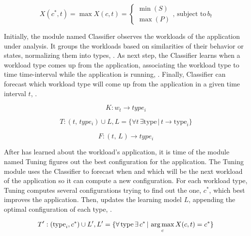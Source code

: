 \begin{equation}
  X(c^{*}, t) = \max{X(c, t)} =
  \begin{cases}
    \min(S) \\
    \max(P)
  \end{cases},\, \text{subject to}\, b_t
  \label{eq:optimization}
\end{equation}

Initially, the module named Classifier observes the workloads of the application under analysis. It groups the
workloads based on similarities of their behavior or states, normalizing them into types, . As next
step, the Classifier learns when a workload type comes up from the application, associating the workload type to time
time-interval while the application is running, . Finally, Classifier can forecast which workload type
will come up from the application in a given time interval $t$, .

\begin{equation}
  K: w_t \rightarrow type_i
  \label{eq:classify}
\end{equation}

\begin{equation}
  T: (t,\, type_i) \cup L, L = \{ \forall t\,\exists \text{type}\, |\, t \rightarrow \text{type}_i \}
  \label{eq:training}
\end{equation}

\begin{equation}
  F: (t, \, L) \rightarrow type_i
  \label{eq:forecast}
\end{equation}

After \name has learned about the workload's application, it is time of the module named Tuning figures out the best
configuration for the application. The Tuning module uses the Classifier to forecast when and which will be the next
workload of the application so it can compute a new configuration. For each workload type, Tuning computes several
configurations trying to find out the one, $c^{*}$, which best improves the application. Then, \name updates the
learning model $L$, appending the optimal configuration of each type, .

\begin{equation}
  T': (\text{type}_i, c^{*} )\cup L', L' = \{ \forall\, \text{type}\, \exists\, c^{*}\, |\, \operatorname*{arg\,max}_c X(c,t) = c^{*}\}
  \label{eq:training-updated}
\end{equation}

